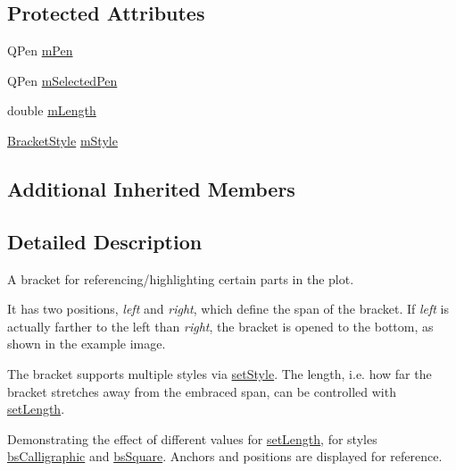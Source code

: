 \subsection*{Protected Attributes}
\begin{DoxyCompactItemize}
\item 
Q\+Pen \hyperlink{class_q_c_p_item_bracket_a350c864a5853b04343719f5a8be6b675}{m\+Pen}
\item 
Q\+Pen \hyperlink{class_q_c_p_item_bracket_adcfb53602d1802d00e2de4fd6df6b291}{m\+Selected\+Pen}
\item 
double \hyperlink{class_q_c_p_item_bracket_ab3d99bba8da18eb4d0e0cb23dded33b2}{m\+Length}
\item 
\hyperlink{class_q_c_p_item_bracket_a7ac3afd0b24a607054e7212047d59dbd}{Bracket\+Style} \hyperlink{class_q_c_p_item_bracket_ac911907184c824d621f274f8e0990080}{m\+Style}
\end{DoxyCompactItemize}
\subsection*{Additional Inherited Members}


\subsection{Detailed Description}
A bracket for referencing/highlighting certain parts in the plot. 

 It has two positions, {\itshape left} and {\itshape right}, which define the span of the bracket. If {\itshape left} is actually farther to the left than {\itshape right}, the bracket is opened to the bottom, as shown in the example image.

The bracket supports multiple styles via \hyperlink{class_q_c_p_item_bracket_a612dffa2373422eef8754d690add3703}{set\+Style}. The length, i.\+e. how far the bracket stretches away from the embraced span, can be controlled with \hyperlink{class_q_c_p_item_bracket_ac7cfc3da7da9b5c5ac5dfbe4f0351b2a}{set\+Length}.

 \begin{center}Demonstrating the effect of different values for \hyperlink{class_q_c_p_item_bracket_ac7cfc3da7da9b5c5ac5dfbe4f0351b2a}{set\+Length}, for styles \hyperlink{class_q_c_p_item_bracket_a7ac3afd0b24a607054e7212047d59dbda8f29f5ef754e2dc9a9efdedb2face0f3}{bs\+Calligraphic} and \hyperlink{class_q_c_p_item_bracket_a7ac3afd0b24a607054e7212047d59dbda7f9df4a7359bfe3dac1dbe4ccf5d220c}{bs\+Square}. Anchors and positions are displayed for reference.\end{center} 

